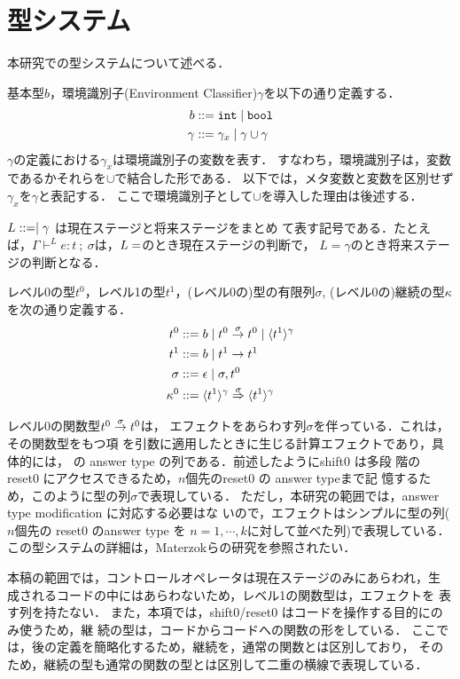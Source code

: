 \chapter{型システム}

本研究での型システムについて述べる．

基本型$b$，環境識別子(Environment Classifier)$\gamma$を以下の通り定義する．
\begin{align*}
  b & ::= \mbox{\texttt{int}} \mid \mbox{\texttt{bool}} \\
  \gamma & ::= \gamma_x \mid \gamma \cup \gamma
\end{align*}
$\gamma$の定義における$\gamma_x$は環境識別子の変数を表す．
すなわち，環境識別子は，変数であるかそれらを$\cup$で結合した形である．
以下では，メタ変数と変数を区別せず$\gamma_x$を$\gamma$と表記する．
ここで環境識別子として$\cup$を導入した理由は後述する．

$L ::= \empty \mid \gamma$ は現在ステージと将来ステージをまとめ
て表す記号である．たとえば，$\Gamma \vdash^L
e:t~;~\sigma$は，$L=\empty$のとき現在ステージの判断で，
$L=\gamma$のとき将来ステージの判断となる．

レベル0の型$t^0$，レベル1の型$t^1$，(レベル0の)型の有限列$\sigma$,
(レベル0の)継続の型$\kappa$を次の通り定義する．
\begin{align*}
  t^0 & ::= b \mid {t^0} \stackrel{\sigma}{\rightarrow} {t^0} \mid \langle{t^1}\rangle^{\gamma} \\
  t^1 & ::= b \mid t^1 \to t^1 \\
  \sigma & ::= \epsilon \mid \sigma,t^0 \\
  \kappa^0 & ::= {\langle{t^1}\rangle^{\gamma}} \stackrel{\sigma}{\Rightarrow} {\langle{t^1}\rangle^{\gamma}}
\end{align*}

レベル0の関数型${t^0} \stackrel{\sigma}{\rightarrow} {t^0}$は，
エフェクトをあらわす列$\sigma$を伴っている．これは，その関数型をもつ項
を引数に適用したときに生じる計算エフェクトであり，具体的には，
\Shiftz の answer type の列である．前述したようにshift0 は多段
階の reset0 にアクセスできるため，$n$個先のreset0 の answer typeまで記
憶するため，このように型の列$\sigma$で表現している．
ただし，本研究の範囲では，answer type modification に対応する必要はな
いので，エフェクトはシンプルに型の列($n$個先の reset0 のanswer type を
$n=1,\cdots,k$に対して並べた列)で表現している．
この型システムの詳細は，Materzokら\cite{Materzok2011}の研究を参照されたい．

本稿の範囲では，コントロールオペレータは現在ステージのみにあらわれ，生
成されるコードの中にはあらわないため，レベル1の関数型は，エフェクトを
表す列を持たない．
また，本項では，shift0/reset0 はコードを操作する目的にのみ使うため，継
続の型は，コードからコードへの関数の形をしている．
ここでは，後の定義を簡略化するため，継続を，通常の関数とは区別しており，
そのため，継続の型も通常の関数の型とは区別して二重の横線で表現している．

